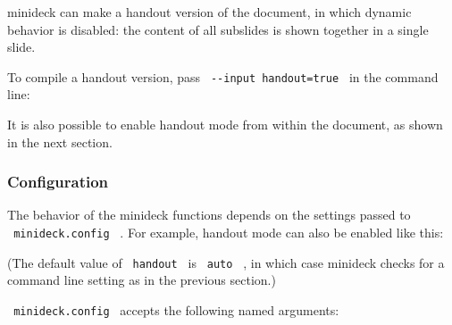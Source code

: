 minideck can make a handout version of the document, in which dynamic
behavior is disabled: the content of all subslides is shown together in
a single slide.

To compile a handout version, pass \texttt{\ -\/-input\ handout=true\ }
in the command line:

\begin{Shaded}
\begin{Highlighting}[]
\end{Highlighting}
\end{Shaded}

It is also possible to enable handout mode from within the document, as
shown in the next section.

\subsubsection{Configuration}\label{configuration}

The behavior of the minideck functions depends on the settings passed to
\texttt{\ minideck.config\ } . For example, handout mode can also be
enabled like this:

\begin{Shaded}
\begin{Highlighting}[]


\NormalTok{\#slide[}
  


\NormalTok{]}
\end{Highlighting}
\end{Shaded}

(The default value of \texttt{\ handout\ } is \texttt{\ auto\ } , in
which case minideck checks for a command line setting as in the previous
section.)

\texttt{\ minideck.config\ } accepts the following named arguments:

